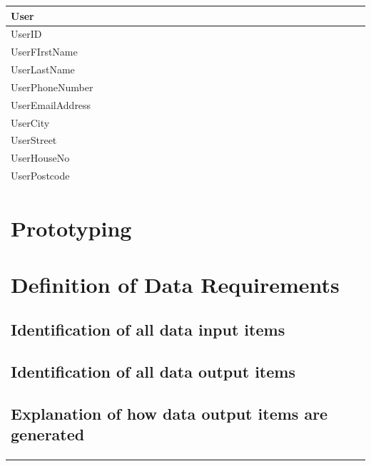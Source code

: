 \begin{center}
\begin{tabular}{|p{3cm}|}
	\hline
	\textbf{User} \\ \hline
	UserID \\
	UserFIrstName \\
	UserLastName \\
	UserPhoneNumber \\
	UserEmailAddress \\
	UserCity \\
	UserStreet \\
	UserHouseNo \\
	UserPostcode \\ \hline
	


\section{Prototyping}

\section{Definition of Data Requirements}

\subsection{Identification of all data input items}

\subsection{Identification of all data output items}

\subsection{Explanation of how data output items are generated}


\end{tabular}
\end{center}
